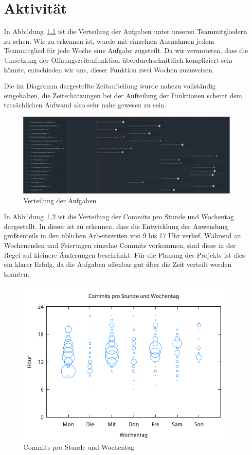 
\chapter{Aktivität}
\label{chap:activity}

In Abbildung~\ref{fig:tasks} ist die Verteilung der Aufgaben unter unseren Teammitgliedern zu sehen.
Wie zu erkennen ist, wurde mit einzelnen Ausnahmen jedem Teammitglied für jede Woche eine Aufgabe zugeteilt.
Da wir vermuteten, dass die Umsetzung der Öffnungszeitenfunktion überdurchschnittlich kompliziert sein könnte,
entschieden wir uns, dieser Funktion zwei Wochen zuzuweisen.

Die im Diagramm dargestellte Zeitaufteilung wurde nahezu vollständig eingehalten,
die Zeitschätzungen bei der Aufteilung der Funktionen scheint dem tatsächlichen Aufwand also sehr nahe gewesen zu sein.

\begin{figure}[ht]
    \centering
    \includegraphics[width=\textwidth]{figures/tasks}
    \caption{Verteilung der Aufgaben}
    \label{fig:tasks}
\end{figure}

In Abbildung~\ref{fig:commits} ist die Verteilung der Commits pro Stunde und Wochentag dargestellt.
In dieser ist zu erkennen, dass die Entwicklung der Anwendung größtenteils in den üblichen Arbeitszeiten von 9 bis 17 Uhr verlief.
Während an Wochenenden und Feiertagen einzelne Commits vorkommen, sind diese in der Regel auf kleinere Änderungen beschränkt.
Für die Planung des Projekts ist dies ein klarer Erfolg, da die Aufgaben offenbar gut über die Zeit verteilt werden konnten.

\begin{figure}[ht]
    \centering
    \includegraphics[width=\textwidth]{figures/hours}
    \caption{Commits pro Stunde und Wochentag}
    \label{fig:commits}
\end{figure}